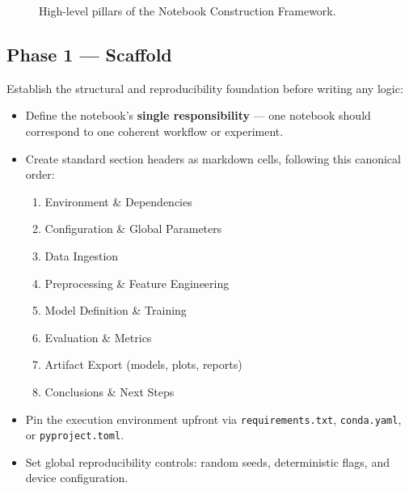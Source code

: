 \documentclass[11pt, a4paper]{article}
\begin{document}
\begin{figure}[ht]
  \centering
  \caption{High-level pillars of the Notebook Construction Framework.}
  \label{fig:construction-tree}
\end{figure}

\subsection*{Phase 1 — Scaffold}

Establish the structural and reproducibility foundation before writing any
logic:

\begin{itemize}
  \item Define the notebook's \textbf{single responsibility} — one notebook
    should correspond to one coherent workflow or experiment.

  \item Create standard section headers as markdown cells, following this
    canonical order:
  \begin{enumerate}
    \item Environment \& Dependencies
    \item Configuration \& Global Parameters
    \item Data Ingestion
    \item Preprocessing \& Feature Engineering
    \item Model Definition \& Training
    \item Evaluation \& Metrics
    \item Artifact Export (models, plots, reports)
    \item Conclusions \& Next Steps
  \end{enumerate}

  \item Pin the execution environment upfront via \texttt{requirements.txt},
    \texttt{conda.yaml}, or \texttt{pyproject.toml}.

  \item Set global reproducibility controls: random seeds, deterministic
    flags, and device configuration.
\end{itemize}
\end{document}
